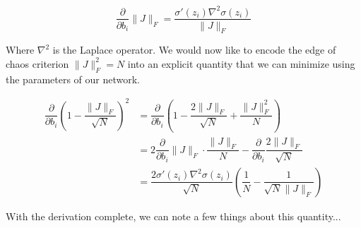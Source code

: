 \begin{equation}
\dfrac{\partial}{\partial b_i}\|J\|_F = \dfrac{\sigma'(z_i) \nabla^2\sigma(z_i)}{\|J\|_F}
\end{equation}

Where $\nabla^2$ is the Laplace operator. We would now like to encode the edge of chaos criterion $\|J\|_F^2=N$ into an explicit quantity that we can minimize using the parameters of our network.

\begin{align}
\dfrac{\partial}{\partial b_i} \left(1-\dfrac{\|J\|_F}{\sqrt{N}}\right)^2 &=  \dfrac{\partial}{\partial b_i}\left(1-\dfrac{2\|J\|_F}{\sqrt{N}}+\dfrac{\|J\|_F^2}{N}\right)\\
&= 2\dfrac{\partial}{\partial b_i}\|J\|_F\cdot\dfrac{\|J\|_F}{N} - \dfrac{\partial}{\partial b_i} \dfrac{2\|J\|_F}{\sqrt{N}}\\
&= \dfrac{2 \sigma'(z_i)\nabla^2 \sigma(z_i)}{\sqrt{N}}\left(\dfrac1N-\dfrac{1}{\sqrt{N}\|J\|_F}\right)
\end{align}

With the derivation complete, we can note a few things about this quantity...